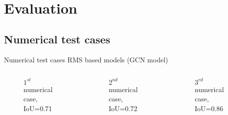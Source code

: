 \documentclass[10pt,aspectratio=169,dvipsnames]{beamer} %
\begin{document}
	\section{Evaluation}
	\subsection{Numerical test cases}
	\begin{frame}{Numerical test cases RMS based models (GCN model)}
		\begin{columns}[T]
			\begin{column}[c]{0.32\textwidth}
				\begin{figure}[c]
					\centering
					\caption{\(1^{st}\) numerical case, IoU=0.71}
				\end{figure}
			\end{column}
			\hfill
			\begin{column}[c]{0.32\textwidth}
				\begin{figure}[c]
					\centering
					\caption{\(2^{nd}\) numerical case, IoU=0.72}
				\end{figure}
			\end{column}
			\hfill
			\begin{column}[c]{0.32\textwidth}
				\begin{figure}[c]
					\centering
					\caption{\(3^{rd}\) numerical case, IoU=0.86}
				\end{figure}					
			\end{column}
		\end{columns}
	\end{frame}
\end{document}
